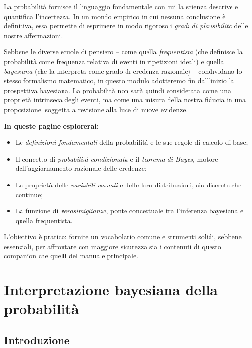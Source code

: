 \documentclass[
  letterpaper,
  DIV=11,
  numbers=noendperiod,
  oneside]{scrreprt}
\providecommand{\tightlist}{%
  \setlength{\itemsep}{0pt}\setlength{\parskip}{0pt}}
\theoremstyle{definition}
\theoremstyle{plain}
\theoremstyle{definition}
\theoremstyle{remark}
\begin{document}
La probabilità fornisce il linguaggio fondamentale con cui la scienza
descrive e quantifica l'incertezza. In un mondo empirico in cui nessuna
conclusione è definitiva, essa permette di esprimere in modo rigoroso i
\emph{gradi di plausibilità} delle nostre affermazioni.

Sebbene le diverse scuole di pensiero -- come quella \emph{frequentista}
(che definisce la probabilità come frequenza relativa di eventi in
ripetizioni ideali) e quella \emph{bayesiana} (che la interpreta come
grado di credenza razionale) -- condividano lo stesso formalismo
matematico, in questo modulo adotteremo fin dall'inizio la prospettiva
bayesiana. La probabilità non sarà quindi considerata come una proprietà
intrinseca degli eventi, ma come una misura della nostra fiducia in una
proposizione, soggetta a revisione alla luce di nuove evidenze.

\textbf{In queste pagine esplorerai:}

\begin{itemize}
\tightlist
\item
  Le \emph{definizioni fondamentali} della probabilità e le sue regole
  di calcolo di base;
\item
  Il concetto di \emph{probabilità condizionata} e il \emph{teorema di
  Bayes}, motore dell'aggiornamento razionale delle credenze;
\item
  Le proprietà delle \emph{variabili casuali} e delle loro
  distribuzioni, sia discrete che continue;
\item
  La funzione di \emph{verosimiglianza}, ponte concettuale tra
  l'inferenza bayesiana e quella frequentista.
\end{itemize}

L'obiettivo è pratico: fornire un vocabolario comune e strumenti solidi,
sebbene essenziali, per affrontare con maggiore sicurezza sia i
contenuti di questo companion che quelli del manuale principale.

\chapter{Interpretazione bayesiana della
probabilità}\label{sec-prob-interpretation}

\section*{Introduzione}\label{introduzione-1}

\end{document}
